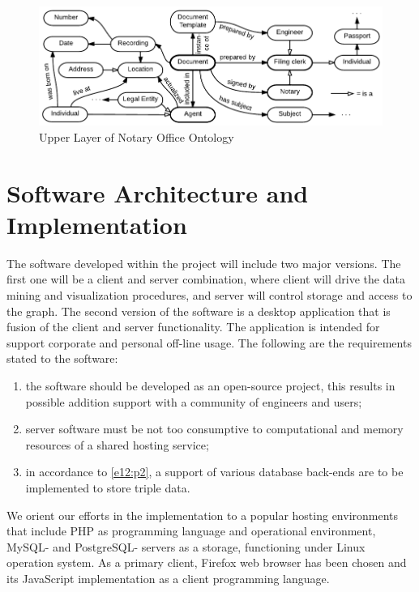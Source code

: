 \documentclass[conference]{IEEEtran}
\begin{document}
\begin{figure}[!t]
\centering
\includegraphics[width=\linewidth]{DocumentOntology-en.pdf}
\caption{Upper Layer of Notary Office Ontology}
\label{notaryontology}
\end{figure}

\section{Software Architecture and Implementation}
\label{sec:arch}

The software developed within the project will include two major
versions.  The first one will be a client and server combination,
where client will drive the data mining and visualization procedures,
and server will control storage and access to the graph.  The second
version of the software is a desktop application that is fusion of the
client and server functionality.  The application is intended for
support corporate and personal off-line usage.  The following are the
requirements stated to the software:
\begin{enumerate}
\item the software should be developed as an open-source project,
  this results in possible addition support with a community of
  engineers and users;
\item server software must be not too consumptive to computational and
  memory resources of a shared hosting service; \label{e12:p2}
\item in accordance to \ref{e12:p2}, a support of various database
  back-ends are to be implemented to store triple data.
\end{enumerate}

We orient our efforts in the implementation to a popular hosting
environments that include PHP as programming language and operational
environment, MySQL- and PostgreSQL- servers as a storage, functioning
under Linux operation system.  As a primary client, Firefox web browser
has been chosen and its JavaScript implementation as a client
programming language.
\end{document}
